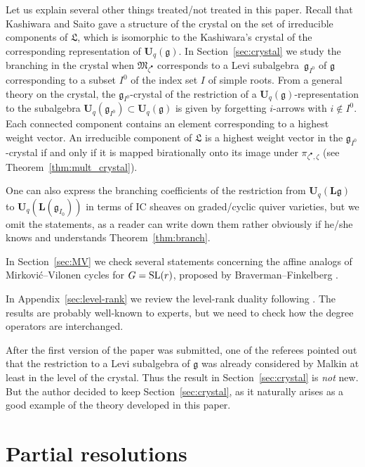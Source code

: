 \documentclass[pdftex]{sigma}
\theoremstyle{definition}
\numberwithin{equation}{section}
\newcommand{\thmref}[1]{Theorem~\ref{#1}}
\newcommand{\secref}[1]{Section~\ref{#1}}
\newcommand{\SL}{\operatorname{\rm SL}}
\newcommand{\g}{{\mathfrak g}}
\newcommand{\M}{{\mathfrak M}} %
\newcommand{\La}{{\mathfrak L}} %
\newcommand{\Uq}{{\mathbf U}_q(\mathfrak g)} %
\newcommand{\Un}{{\mathbf U}_q}
\newcommand{\Ul}{{\mathbf U}_q({\mathbf L}{\mathfrak g})} %
\begin{document}
Let us explain several other things treated/not treated in this paper.
%
Recall that Kashiwara and Saito \cite{KS,Saito} gave a structure of
the crystal on the set of irreducible components of $\La$, which is
isomorphic to the Kashiwara's crystal of the corresponding
representation of $\Uq$.
%
In \secref{sec:crystal} we study the branching in the crystal when
$\M_{\zeta^\bullet}$ corresponds to a Levi subalgebra~$\g_{I^0}$ of
$\g$ corresponding to a subset $I^0$ of the index set $I$ of simple
roots. From a general theory on the crystal, the $\g_{I^0}$-crystal of
the restriction of a $\Uq$-representation to the subalgebra
$\Un(\g_{I^0})\subset \Uq$ is given by forgetting $i$-arrows with
$i\notin I^0$.
%
Each connected component contains an element corresponding to a
highest weight vector.
%
An irreducible component of $\La$ is a highest weight vector in the
$\g_{I^0}$-crystal if and only if it is mapped birationally onto its
image under $\pi_{\zeta^\bullet,\zeta}$ (see
\thmref{thm:mult_crystal}).

One can also express the branching coef\/f\/icients of the restriction
from $\Ul$ to ${\mathbf U}_q({\mathbf L}({\mathfrak g_{I_0}}))$ in
terms of IC sheaves on graded/cyclic quiver varieties, but we omit the
statements, as a reader can write down them rather obviously if he/she
knows \cite{Na-qaff} and understands \thmref{thm:branch}.

In \secref{sec:MV} we check several statements concerning the
af\/f\/ine analogs of Mirkovi\'c--Vilonen cycles for $G = \SL(r)$, proposed
by Braverman--Finkelberg \cite{braverman-prep}.

In Appendix~\ref{sec:level-rank} we review the level-rank duality following
\cite{Hasegawa,NT}. The results are probably well-known to experts,
but we need to check how the degree operators are interchanged.

After the f\/irst version of the paper was submitted, one of the
referees pointed out that the restriction to a Levi subalgebra of $\g$
was already considered by Malkin \cite[\S~3]{Malkin} at least in the
level of the crystal. Thus the result in \secref{sec:crystal} is {\it
  not} new. But the author decided to keep \secref{sec:crystal}, as
it naturally arises as a good example of the theory developed in this
paper.



\section{Partial resolutions}\label{sec:partial}
\end{document}
